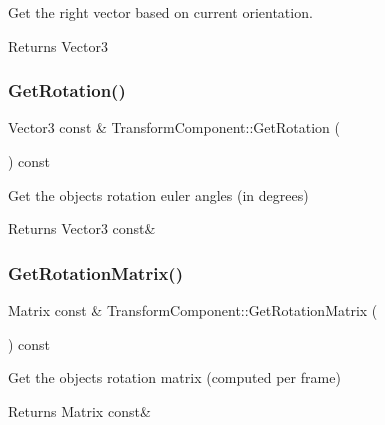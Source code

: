 Get the right vector based on current orientation. 

\begin{DoxyReturn}{Returns}
Vector3 
\end{DoxyReturn}
\mbox{\label{classTransformComponent_a66072d2fe63c96e8cded35fca0579400}} 
\subsubsection{\texorpdfstring{Get\+Rotation()}{GetRotation()}}
{\footnotesize\ttfamily Vector3 const  \& Transform\+Component\+::\+Get\+Rotation (\begin{DoxyParamCaption}{ }\end{DoxyParamCaption}) const}



Get the object\textquotesingle{}s rotation euler angles (in degrees) 

\begin{DoxyReturn}{Returns}
Vector3 const\& 
\end{DoxyReturn}
\mbox{\label{classTransformComponent_a95adaed6de8c45ab76479fe990dbb5cc}} 
\subsubsection{\texorpdfstring{Get\+Rotation\+Matrix()}{GetRotationMatrix()}}
{\footnotesize\ttfamily Matrix const  \& Transform\+Component\+::\+Get\+Rotation\+Matrix (\begin{DoxyParamCaption}{ }\end{DoxyParamCaption}) const}



Get the object\textquotesingle{}s rotation matrix (computed per frame) 

\begin{DoxyReturn}{Returns}
Matrix const\& 
\end{DoxyReturn}
\mbox{\label{classTransformComponent_af9a3c385a334fadeac09a18149e89d05}} 
